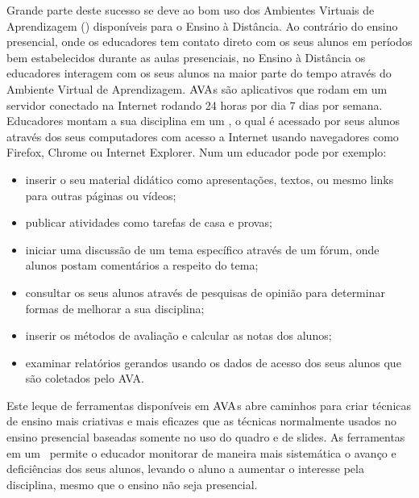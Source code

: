  

Grande parte deste sucesso se deve ao bom uso dos Ambientes Virtuais de Aprendizagem (\ava) disponíveis para
o Ensino à Distância. Ao contrário do ensino presencial, onde os educadores tem contato direto 
com os seus alunos em períodos bem estabelecidos durante as aulas presenciais, 
no Ensino à Distância os educadores interagem com os seus alunos na maior parte do tempo 
através do Ambiente Virtual de Aprendizagem. $\hbox{AVA}$s são aplicativos que rodam em um servidor 
conectado na Internet rodando 24 horas por dia 7 dias por semana. Educadores montam a sua disciplina em um \ava, o qual é acessado 
por seus alunos através dos seus computadores com acesso a Internet usando navegadores como Firefox, Chrome ou Internet Explorer. 
Num \ava um educador pode por exemplo:
\begin{itemize}
 \item inserir o seu material didático como apresentações, textos, ou mesmo links para outras páginas ou vídeos;
 \item publicar atividades como tarefas de casa e provas;
 \item iniciar uma discussão de um tema específico através de um fórum, onde alunos postam comentários a 
 respeito do tema;
 \item consultar os seus alunos através de pesquisas de opinião para determinar formas de melhorar a sua disciplina;
 \item inserir os métodos de avaliação e calcular as notas dos alunos;
 \item examinar relatórios gerandos usando os dados de acesso dos seus alunos que são 
coletados pelo AVA.
\end{itemize}
Este leque de ferramentas disponíveis em $\hbox{AVA}$s abre caminhos para criar técnicas de ensino 
mais criativas e mais eficazes que as técnicas normalmente usados no ensino presencial
baseadas somente no uso do quadro e de slides. As ferramentas em um \ava\ permite  
o educador monitorar de maneira mais sistemática o avanço e deficiências dos seus alunos, 
levando o aluno a aumentar o interesse pela disciplina, mesmo que o ensino não seja presencial. 

